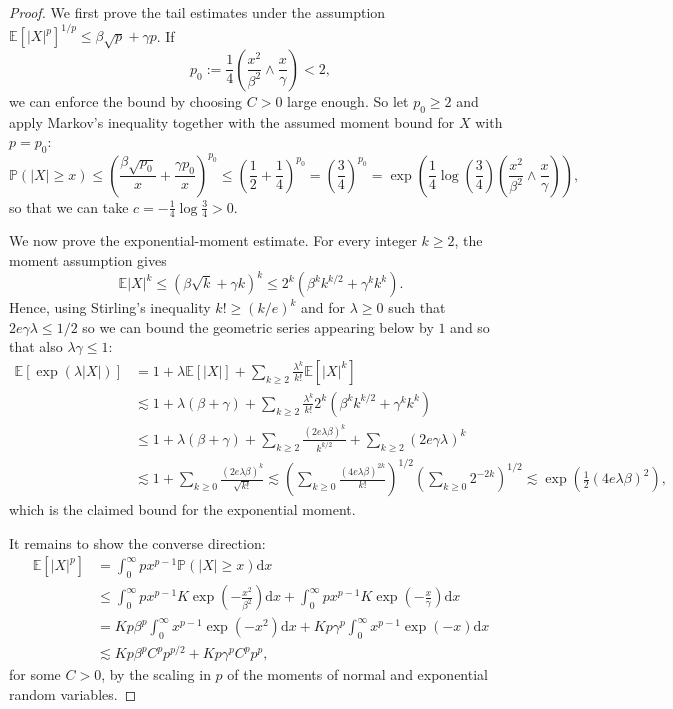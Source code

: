 \documentclass[a4paper,12pt]{article}
\newcommand{\mathd}{\mathrm{d}}
\begin{document}
\begin{proof}
  We first prove the tail estimates under the assumption $\mathbb{E} [| X |^p]^{1 / p} \leq \beta \sqrt{p} + \gamma p$. If
  \[
        p_0 := \frac{1}{4} \left( \frac{x^2}{\beta^2} \wedge \frac{x}{\gamma} \right) < 2,
  \]
  we can enforce the bound by choosing $C>0$ large enough. So let $p_0 \ge 2$ and apply Markov's inequality together with the assumed moment bound for $X$ with $p=p_0$:
  \[ \mathbb{P} (| X | \geq x) \leq \left( \frac{
         \beta \sqrt{p_0}}{ x}  + \frac{\gamma p_0}{x}\right)^{p_0} \leq \left(\frac12 + \frac{1}{4}\right)^{p_0} = \left(\frac34\right)^{p_0} = \exp\left(\frac14 \log \left(\frac34 \right)  \left( \frac{x^2}{\beta^2} \wedge \frac{x}{\gamma} \right)\right) ,
  \]
  so that we can take $c=-\frac14 \log \frac34>0$. 
  
  We now prove the exponential-moment estimate. For every integer $k \geq 2$, the moment assumption gives
  \[
  \mathbb{E}|X|^k \leq (\beta\sqrt{k} + \gamma k)^k \leq 2^{k}( \beta^k k^{k/2}+\gamma^k k^k).
  \]
  Hence, using 
   Stirling's inequality $k! \geq (k / e)^k$ and for $\lambda\ge 0$ such that $2e\gamma\lambda\leq 1/2$ so we can bound the geometric series appearing below by $1$ and so that also $\lambda\gamma\le 1$: 
\begin{align*}
       \mathbb{E} [\exp (\lambda | X |)] & = 1+ \lambda\mathbb E[|X|] + \sum_{k \geq 2}
    \frac{\lambda^k}{k!} \mathbb{E} [| X |^k] \nonumber \\
    & \lesssim 
    1+ \lambda(\beta+\gamma) + \sum_{k \geq 2} \frac{\lambda^k}{k!} 2^k (\beta^k k^{k / 2} + \gamma^k k^k) \nonumber \\
    & \leq 
    1+ \lambda(\beta+\gamma) + \sum_{k \geq 2} \frac{(2 e
    \lambda \beta)^k} { k^{k / 2}} + \sum_{k \geq 2} (2e\gamma \lambda)^k \\ 
    & \lesssim 1+\sum_{k \geq 0} \frac{(2 e
    \lambda \beta)^k} { \sqrt{k!}}  \lesssim  \left(\sum_{k \geq 0} \frac{(4 e
    \lambda \beta)^{2k}} { k!}\right)^{1/2} \left(\sum_{k \geq 0} 2^{-2k}\right)^{1/2} \lesssim \exp\left(\frac12 (4e\lambda\beta)^2\right),
\end{align*} 
which is the claimed bound for the exponential moment.

It remains to show the converse direction:
\begin{align*}
    \mathbb E[|X|^p] & = \int_0^\infty p x^{p-1} \mathbb P(|X| \ge x) \mathd x \\
    & \leq \int_0^\infty p x^{p-1} K \exp\left( - \frac{x^2}{\beta^2} \right) \mathd x + \int_0^\infty p x^{p-1} K \exp\left( - \frac{x}{\gamma} \right) \mathd x \\
    & = K p \beta^{p} \int_0^\infty x^{p-1} \exp(- x^2)\mathd x + Kp\gamma^p \int_0^\infty x^{p-1} \exp(-x)\mathd x \\
    & \lesssim K p \beta^{p} C^p p^{p/2} + K p\gamma^p C^p p^p,
\end{align*}
for some $C>0$, by the scaling in $p$ of the moments of normal and exponential random variables.
\end{proof}
\end{document}
